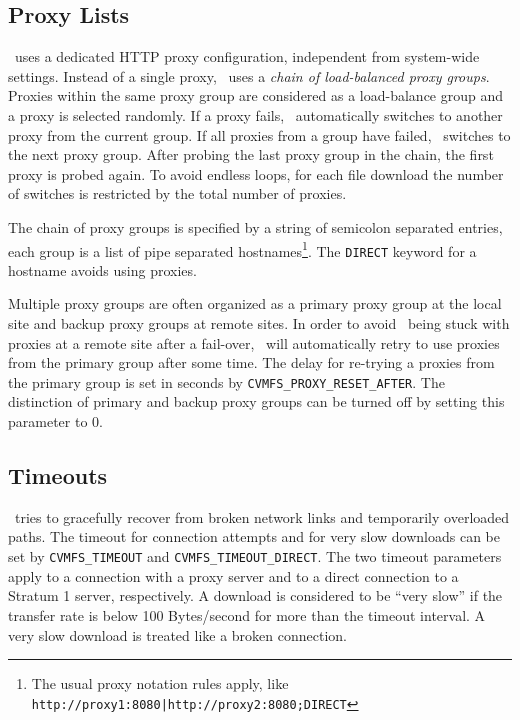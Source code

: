 \subsection{Proxy Lists}
\cvmfs\ uses a dedicated HTTP proxy configuration, independent from system-wide settings.
Instead of a single proxy, \cvmfs\ uses a \emph{chain of load-balanced proxy groups}.
Proxies within the same proxy group are considered as a load-balance group and a proxy is selected randomly.
If a proxy fails, \cvmfs\ automatically switches to another proxy from the current group.
If all proxies from a group have failed, \cvmfs\ switches to the next proxy group.
After probing the last proxy group in the chain, the first proxy is probed again.
To avoid endless loops, for each file download the number of switches is restricted by the total number of proxies.

The chain of proxy groups is specified by a string of semicolon separated entries, each group is a list of pipe separated hostnames\footnote{The usual proxy notation rules apply, like \texttt{http://proxy1:8080|http://proxy2:8080;DIRECT}}.
The \texttt{DIRECT} keyword for a hostname avoids using proxies.

Multiple proxy groups are often organized as a primary proxy group at the local site and backup proxy groups at remote sites.
In order to avoid \cvmfs\ being stuck with proxies at a remote site after a fail-over, \cvmfs\ will automatically retry to use proxies from the primary group after some time.
The delay for re-trying a proxies from the primary group is set in seconds by \texttt{CVMFS\_PROXY\_RESET\_AFTER}.
The distinction of primary and backup proxy groups can be turned off by setting this parameter to 0.

\subsection{Timeouts}
\cvmfs\ tries to gracefully recover from broken network links and temporarily overloaded paths.
The timeout for connection attempts and for very slow downloads can be set by \texttt{CVMFS\_TIMEOUT} and \texttt{CVMFS\_TIMEOUT\_DIRECT}.
The two timeout parameters apply to a connection with a proxy server and to a direct connection to a Stratum 1 server, respectively.
A download is considered to be ``very slow'' if the transfer rate is below 100 Bytes/second for more than the timeout interval.
A very slow download is treated like a broken connection.

